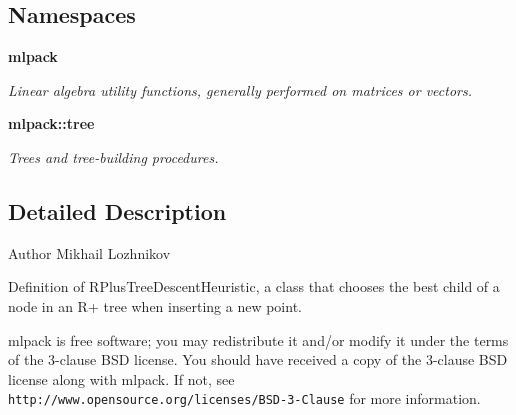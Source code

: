 \subsection*{Namespaces}
\begin{DoxyCompactItemize}
\item 
 {\bf mlpack}
\begin{DoxyCompactList}\small\item\em Linear algebra utility functions, generally performed on matrices or vectors. \end{DoxyCompactList}\item 
 {\bf mlpack\+::tree}
\begin{DoxyCompactList}\small\item\em Trees and tree-\/building procedures. \end{DoxyCompactList}\end{DoxyCompactItemize}


\subsection{Detailed Description}
\begin{DoxyAuthor}{Author}
Mikhail Lozhnikov
\end{DoxyAuthor}
Definition of R\+Plus\+Tree\+Descent\+Heuristic, a class that chooses the best child of a node in an R+ tree when inserting a new point.

mlpack is free software; you may redistribute it and/or modify it under the terms of the 3-\/clause B\+SD license. You should have received a copy of the 3-\/clause B\+SD license along with mlpack. If not, see {\tt http\+://www.\+opensource.\+org/licenses/\+B\+S\+D-\/3-\/\+Clause} for more information. 